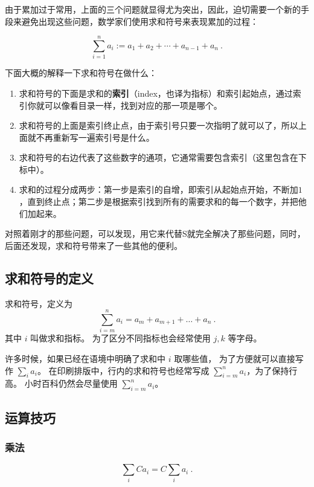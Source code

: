 由于累加过于常用，上面的三个问题就显得尤为突出，因此，迫切需要一个新的手段来避免出现这些问题，数学家们使用求和符号来表现累加的过程：

\begin{equation}
\sum_{i=1}^n a_i:=a_1+a_2+\cdots+a_{n-1}+a_{n}~.
\end{equation}

下面大概的解释一下求和符号在做什么：
\begin{enumerate}
\item 求和符号的下面是求和的\textbf{索引}（index，也译为指标）和索引起始点，通过索引你就可以像看目录一样，找到对应的那一项是哪个。
\item 求和符号的上面是索引终止点，由于索引号只要一次指明了就可以了，所以上面就不再重新写一遍索引号是什么。
\item 求和符号的右边代表了这些数字的通项，它通常需要包含索引（这里包含在下标中）。
\item 求和的过程分成两步：第一步是索引的自增，即索引从起始点开始，不断加$1$，直到终止点；第二步是根据索引找到所有的需要求和的每一个数字，并把他们加起来。
\end{enumerate}

对照着刚才的那些问题，可以发现，用它来代替S就完全解决了那些问题，同时，后面还发现，求和符号带来了一些其他的便利。

\subsection{求和符号的定义}

求和符号，定义为
\begin{equation}
\sum_{i=m}^n a_i = a_m + a_{m+1} + \dots + a_n~.
\end{equation}
其中 $i$ 叫做求和指标。 为了区分不同指标也会经常使用 $j,k$ 等字母。

许多时候，如果已经在语境中明确了求和中 $i$ 取哪些值， 为了方便就可以直接写作 $\sum\limits_i a_i$。 在印刷排版中，行内的求和符号也经常写成 $\sum_{i=m}^n a_i$，为了保持行高。 小时百科仍然会尽量使用 $\sum\limits_{i=m}^n a_i$。
\subsection{运算技巧}

\subsubsection{乘法}
\begin{equation}
\sum_i C a_i = C\sum_i a_i~.
\end{equation}

